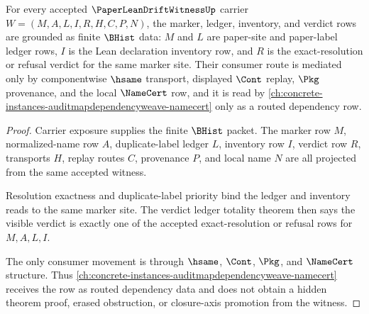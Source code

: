 \begin{theorem}
\label{thm:paper-lean-drift-witness-consumer-row-scope}
For every accepted $\PaperLeanDriftWitnessUp$ carrier $W=(M,A,L,I,R,H,C,P,N)$, the marker, ledger, inventory, and verdict rows are grounded as finite $\BHist$ data: $M$ and $L$ are paper-site and paper-label ledger rows, $I$ is the Lean declaration inventory row, and $R$ is the exact-resolution or refusal verdict for the same marker site. Their consumer route is mediated only by componentwise $\hsame$ transport, displayed $\Cont$ replay, $\Pkg$ provenance, and the local $\NameCert$ row, and it is read by \autoref{ch:concrete-instances-auditmapdependencyweave-namecert} only as a routed dependency row.
\end{theorem}
\begin{proof}
Carrier exposure supplies the finite $\BHist$ packet. The marker row $M$, normalized-name row $A$, duplicate-label ledger $L$, inventory row $I$, verdict row $R$, transports $H$, replay routes $C$, provenance $P$, and local name $N$ are all projected from the same accepted witness.

Resolution exactness and duplicate-label priority bind the ledger and inventory reads to the same marker site. The verdict ledger totality theorem then says the visible verdict is exactly one of the accepted exact-resolution or refusal rows for $M,A,L,I$.

The only consumer movement is through $\hsame$, $\Cont$, $\Pkg$, and $\NameCert$ structure. Thus \autoref{ch:concrete-instances-auditmapdependencyweave-namecert} receives the row as routed dependency data and does not obtain a hidden theorem proof, erased obstruction, or closure-axis promotion from the witness.
\end{proof}

